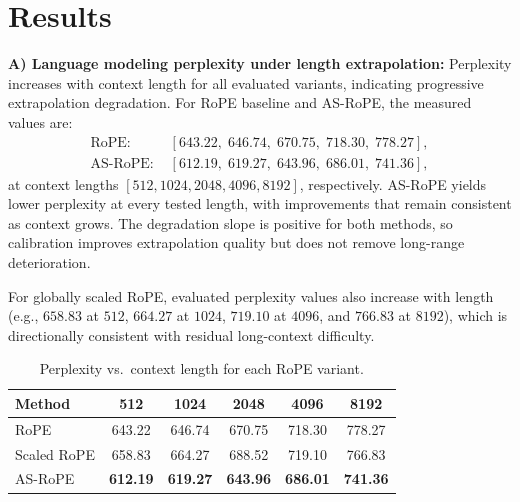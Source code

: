 \documentclass[conference]{IEEEtran}
\begin{document}
\section{Results}
\textbf{A) Language modeling perplexity under length extrapolation:} Perplexity increases with context length for all evaluated variants, indicating progressive extrapolation degradation. For RoPE baseline and AS-RoPE, the measured values are:
\begin{align}
\text{RoPE: } & [643.22,\;646.74,\;670.75,\;718.30,\;778.27], \\
\text{AS-RoPE: } & [612.19,\;619.27,\;643.96,\;686.01,\;741.36],
\end{align}
at context lengths $[512,1024,2048,4096,8192]$, respectively. AS-RoPE yields lower perplexity at every tested length, with improvements that remain consistent as context grows. The degradation slope is positive for both methods, so calibration improves extrapolation quality but does not remove long-range deterioration.

For globally scaled RoPE, evaluated perplexity values also increase with length (e.g., $658.83$ at $512$, $664.27$ at $1024$, $719.10$ at $4096$, and $766.83$ at $8192$), which is directionally consistent with residual long-context difficulty.


\begin{table}[t]
\centering
\caption{Perplexity vs.\ context length for each RoPE variant.}
\label{tab:lm_ppl}
\begin{tabular}{lccccc}
\toprule
\textbf{Method} & \textbf{512} & \textbf{1024} & \textbf{2048} & \textbf{4096} & \textbf{8192} \\
\midrule
RoPE       & 643.22 & 646.74 & 670.75 & 718.30 & 778.27 \\
Scaled RoPE & 658.83 & 664.27 & 688.52 & 719.10 & 766.83 \\
AS-RoPE    & \textbf{612.19} & \textbf{619.27} & \textbf{643.96} & \textbf{686.01} & \textbf{741.36} \\
\bottomrule
\end{tabular}
\end{table}
\end{document}
